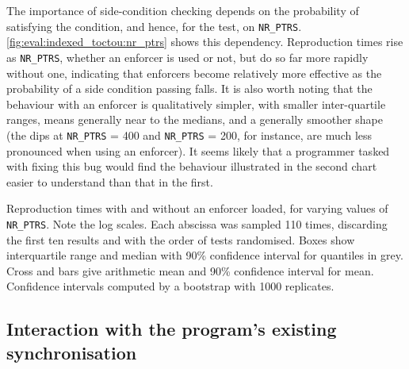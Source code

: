 The importance of side-condition checking depends on the probability
of satisfying the condition, and hence, for the  test,
on \texttt{NR\_PTRS}.  \autoref{fig:eval:indexed_toctou:nr_ptrs} shows
this dependency.  Reproduction times rise as \texttt{NR\_PTRS},
whether an enforcer is used or not, but do so far more rapidly without
one, indicating that {\technique} enforcers become relatively more
effective as the probability of a side condition passing falls.  It is
also worth noting that the behaviour with an enforcer is qualitatively
simpler, with smaller inter-quartile ranges, means generally near to
the medians, and a generally smoother shape (the dips at
\texttt{NR\_PTRS} = 400 and \texttt{NR\_PTRS} = 200, for instance, are
much less pronounced when using an enforcer).  It seems likely that a
programmer tasked with fixing this bug would find the behaviour
illustrated in the second chart easier to understand than that in the
first.

\begin{sanefig}
  \caption{Reproduction times with and without an enforcer loaded, for
    varying values of \texttt{NR\_PTRS}.  Note the log scales.  Each
    abscissa was sampled 110 times, discarding the first ten results
    and with the order of tests randomised.  Boxes show interquartile
    range and median with 90\% confidence interval for quantiles in
    grey.  Cross and bars give arithmetic mean and 90\% confidence
    interval for mean.  Confidence intervals computed by a bootstrap
    with 1000 replicates.}
  \label{fig:eval:indexed_toctou:nr_ptrs}
\end{sanefig}

\subsection{Interaction with the program's existing synchronisation}


